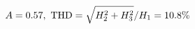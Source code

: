\documentclass[preview]{standalone}
\begin{document}
\begin{align*}
\special{dvisvgm:raw <g id='unique000'>}A=0.57,\ \text{THD}=\sqrt{H_2^2+H_3^2}/H_1=10.8\%\special{dvisvgm:raw </g>}
\end{align*}
\end{document}
